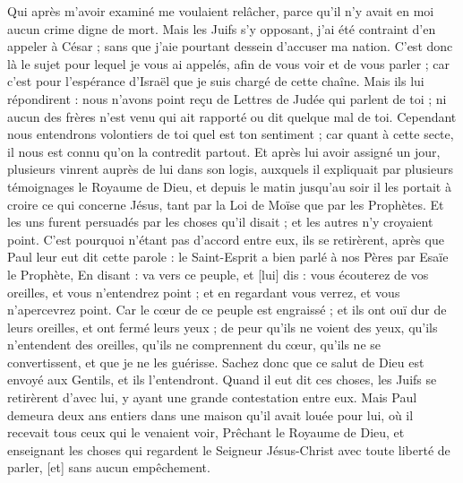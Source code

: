 \begin{multicols}{2}
Qui après m'avoir examiné me voulaient relâcher, parce qu'il n'y avait en moi aucun crime digne de mort.
Mais les Juifs s'y opposant, j'ai été contraint d'en appeler à César ; sans que j'aie pourtant dessein d'accuser ma nation.
C'est donc là le sujet pour lequel je vous ai appelés, afin de vous voir et de vous parler ; car c'est pour l'espérance d'Israël que je suis chargé de cette chaîne.
Mais ils lui répondirent : nous n'avons point reçu de Lettres de Judée qui parlent de toi ; ni aucun des frères n'est venu qui ait rapporté ou dit quelque mal de toi.
Cependant nous entendrons volontiers de toi quel est ton sentiment ; car quant à cette secte, il nous est connu qu'on la contredit partout.
Et après lui avoir assigné un jour, plusieurs vinrent auprès de lui dans son logis, auxquels il expliquait par plusieurs témoignages le Royaume de Dieu, et depuis le matin jusqu'au soir il les portait à croire ce qui concerne Jésus, tant par la Loi de Moïse que par les Prophètes.
Et les uns furent persuadés par les choses qu'il disait ; et les autres n'y croyaient point.
C'est pourquoi n'étant pas d'accord entre eux, ils se retirèrent, après que Paul leur eut dit cette parole : le Saint-Esprit a bien parlé à nos Pères par Esaïe le Prophète,
En disant : va vers ce peuple, et [lui] dis : vous écouterez de vos oreilles, et vous n'entendrez point ; et en regardant vous verrez, et vous n'apercevrez point.
Car le cœur de ce peuple est engraissé ; et ils ont ouï dur de leurs oreilles, et ont fermé leurs yeux ; de peur qu'ils ne voient des yeux, qu'ils n'entendent des oreilles, qu'ils ne comprennent du cœur, qu'ils ne se convertissent, et que je ne les guérisse.
Sachez donc que ce salut de Dieu est envoyé aux Gentils, et ils l'entendront.
Quand il eut dit ces choses, les Juifs se retirèrent d'avec lui, y ayant une grande contestation entre eux.
Mais Paul demeura deux ans entiers dans une maison qu'il avait louée pour lui, où il recevait tous ceux qui le venaient voir,
Prêchant le Royaume de Dieu, et enseignant les choses qui regardent le Seigneur Jésus-Christ avec toute liberté de parler, [et] sans aucun empêchement.
\PPE{}
\end{multicols}
